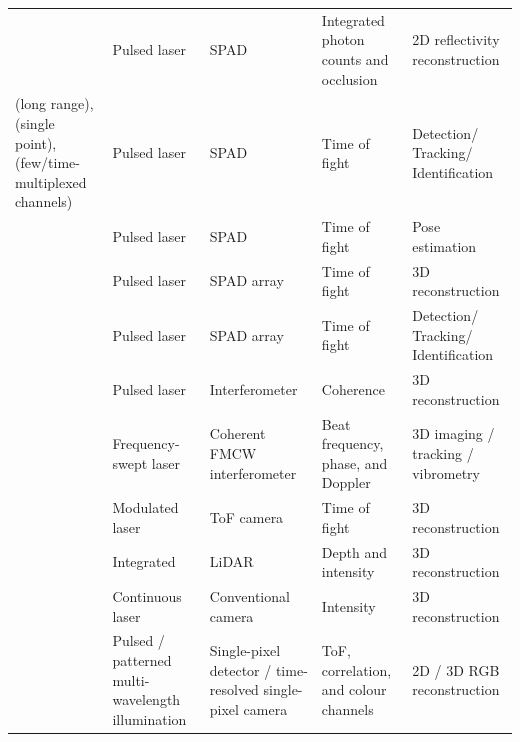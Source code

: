 \begin{table}[!t]
{\begin{tabular}{>{\raggedright}m{3.3cm}m{3.7cm}m{3cm}m{2cm}m{3cm}}
    \cite{thrampoulidisExploitingOcclusionNonLineofSight2018,xuPhotonEfficientOcclusion2018} & Pulsed laser & SPAD & Integrated photon counts and occlusion & 2D reflectivity reconstruction\\%
    \cite{chanNonlineofsightTrackingPeople2017a,celebiHumanDetectionNLOS2026}(long range),\cite{caramazzaNeuralNetworkIdentification2017,musarraDetectionIdentificationTracking2019}(single point),\cite{zhengSingleChannelTimeMultiplexNLOS2024,liFewChannelSizeNLOS2024}(few/time-multiplexed channels) & Pulsed laser & SPAD & Time of fight &  Detection/ Tracking/ Identification\\%
    \cite{isogawaOpticalNonLineofSightPhysicsBased2020,houMultiPersonPose2025,romanelliFiniteApertureYawNLOS2026,xiaoNLOSHumanPose2026} & Pulsed laser & SPAD & Time of fight &  Pose estimation\\%
    \cite{nam_real-time_2020,jinScannerlessNonlineofsightThree2020,zhangRealTimeScanFreeNLOS2024,zhangSubpixelModulation2025,zhangSpatialCorrelationNLOS2025,albertEyeSafeNLOS2026} & Pulsed laser & SPAD array & Time of fight &  3D reconstruction\\%
    \cite{gariepyDetectionTrackingMoving2016} & Pulsed laser & SPAD array & Time of fight &  Detection/ Tracking/ Identification\\%
    \cite{Willomitzer:18,xinTheoryFermatPaths2019,rezaPhasorFieldWaves2019} & Pulsed laser & Interferometer & Coherence &  3D reconstruction\\%
    \cite{huangCombCalibratedNLOS2024,yeCombCalibratedFMCWTracking2025,chenVectorEnhancedFMCWNLOS2025,liangFMCWNLOS2026} & Frequency-swept laser & Coherent FMCW interferometer & Beat frequency, phase, and Doppler & 3D imaging / tracking / vibrometry\\%
    \cite{heideDiffuseMirrors3D2014,kadambiOccludedImagingTimeofflight2016,caligiuriNIGHT2024} & Modulated laser & ToF camera & Time of fight &  3D reconstruction\\%
    \cite{zhuFastNonlineofsightImaging2021a} & Integrated & LiDAR & Depth and intensity &  3D reconstruction\\%
    \cite{chenSteadystateNonLineofSightImaging2019,vedaldi_imaging_2020,roueinfarNIRRaster2025,liuPolarizationDifferentialCorrelography2025} & Continuous laser & Conventional camera & Intensity &  3D reconstruction\\%
    \cite{musarra3DRGBSinglePixel2019,liActiveModeSinglePixelNLOS2023,liMultiWavelengthSinglePixelNLOS2024} & Pulsed / patterned multi-wavelength illumination & Single-pixel detector / time-resolved single-pixel camera & ToF, correlation, and colour channels & 2D / 3D RGB reconstruction\\%

\end{tabular}}
\end{table}
